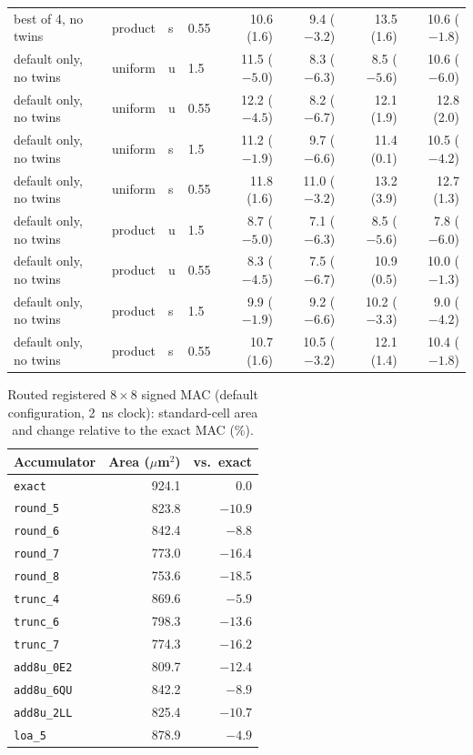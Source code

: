 \begin{table}[t]
\begin{tabular}{llllrrrr}
best of 4, no twins & product & s & 0.55 & 10.6 (1.6) & 9.4 ($-3.2$) & 13.5 (1.6) & 10.6 ($-1.8$)\\
default only, no twins & uniform & u & 1.5 & 11.5 ($-5.0$) & 8.3 ($-6.3$) & 8.5 ($-5.6$) & 10.6 ($-6.0$)\\
default only, no twins & uniform & u & 0.55 & 12.2 ($-4.5$) & 8.2 ($-6.7$) & 12.1 (1.9) & 12.8 (2.0)\\
default only, no twins & uniform & s & 1.5 & 11.2 ($-1.9$) & 9.7 ($-6.6$) & 11.4 (0.1) & 10.5 ($-4.2$)\\
default only, no twins & uniform & s & 0.55 & 11.8 (1.6) & 11.0 ($-3.2$) & 13.2 (3.9) & 12.7 (1.3)\\
default only, no twins & product & u & 1.5 & 8.7 ($-5.0$) & 7.1 ($-6.3$) & 8.5 ($-5.6$) & 7.8 ($-6.0$)\\
default only, no twins & product & u & 0.55 & 8.3 ($-4.5$) & 7.5 ($-6.7$) & 10.9 (0.5) & 10.0 ($-1.3$)\\
default only, no twins & product & s & 1.5 & 9.9 ($-1.9$) & 9.2 ($-6.6$) & 10.2 ($-3.3$) & 9.0 ($-4.2$)\\
default only, no twins & product & s & 0.55 & 10.7 (1.6) & 10.5 ($-3.2$) & 12.1 (1.4) & 10.4 ($-1.8$)\\
\bottomrule
\end{tabular}
\end{table}

\begin{table}[t]
\centering
\caption{Routed registered $8\times8$ signed MAC (default configuration, 2~ns clock): standard-cell area and change relative to the exact MAC (\%).}
\label{tab:mac}
\footnotesize
\begin{tabular}{lrr}
\toprule
Accumulator & Area ($\mu$m$^2$) & vs.\ exact\\
\midrule
\texttt{exact} & 924.1 & 0.0\\
\texttt{round\_5} & 823.8 & $-10.9$\\
\texttt{round\_6} & 842.4 & $-8.8$\\
\texttt{round\_7} & 773.0 & $-16.4$\\
\texttt{round\_8} & 753.6 & $-18.5$\\
\texttt{trunc\_4} & 869.6 & $-5.9$\\
\texttt{trunc\_6} & 798.3 & $-13.6$\\
\texttt{trunc\_7} & 774.3 & $-16.2$\\
\texttt{add8u\_0E2} & 809.7 & $-12.4$\\
\texttt{add8u\_6QU} & 842.2 & $-8.9$\\
\texttt{add8u\_2LL} & 825.4 & $-10.7$\\
\texttt{loa\_5} & 878.9 & $-4.9$\\
\bottomrule
\end{tabular}
\end{table}
